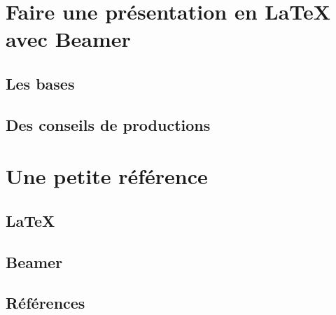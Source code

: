 \documentclass[10pt,t]{beamer}
\begin{document}

\section{Faire une présentation en \LaTeX{} avec Beamer}


\subsection{Les bases}


\subsection{Des conseils de productions}



\section{Une petite référence}


\subsection{\LaTeX{}}


\subsection{Beamer}


\subsection{Références}



\end{document}
